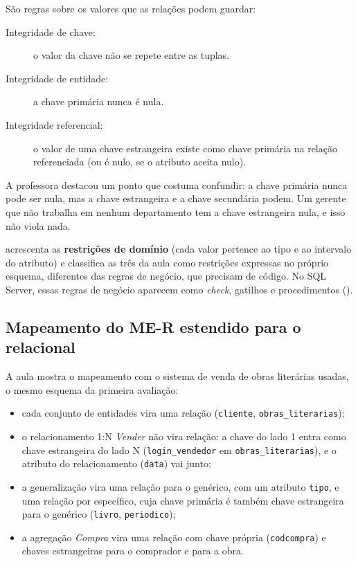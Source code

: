São regras sobre os valores que as relações podem guardar:

\begin{description}
	\item[Integridade de chave:] o valor da chave não se repete entre as
	tuplas.
	\item[Integridade de entidade:] a chave primária nunca é nula.
	\item[Integridade referencial:] o valor de uma chave estrangeira existe
	como chave primária na relação referenciada (ou é nulo, se o atributo
	aceita nulo).
\end{description}

A professora destacou um ponto que costuma confundir: a chave primária
nunca pode ser nula, mas a chave estrangeira e a chave secundária podem.
Um gerente que não trabalha em nenhum departamento tem a chave
estrangeira nula, e isso não viola nada.

\textcite[seção 3.2]{Elmasri2011} acrescenta as \textbf{restrições de
domínio} (cada valor pertence ao tipo e ao intervalo do atributo) e
classifica as três da aula como restrições expressas no próprio esquema,
diferentes das regras de negócio, que precisam de código. No SQL Server,
essas regras de negócio aparecem como \emph{check}, gatilhos e
procedimentos ().

\subsection{Mapeamento do ME-R estendido para o relacional}

A aula mostra o mapeamento com o sistema de venda de obras literárias
usadas, o mesmo esquema da primeira avaliação:

\begin{itemize}
	\item cada conjunto de entidades vira uma relação (\texttt{cliente},
	\texttt{obras\_literarias});
	\item o relacionamento 1:N \emph{Vender} não vira relação: a chave do
	lado 1 entra como chave estrangeira do lado N
	(\texttt{login\_vendedor} em \texttt{obras\_literarias}), e o atributo
	do relacionamento (\texttt{data}) vai junto;
	\item a generalização vira uma relação para o genérico, com um
	atributo \texttt{tipo}, e uma relação por específico, cuja chave
	primária é também chave estrangeira para o genérico (\texttt{livro},
	\texttt{periodico});
	\item a agregação \emph{Compra} vira uma relação com chave própria
	(\texttt{codcompra}) e chaves estrangeiras para o comprador e para a
	obra.
\end{itemize}

